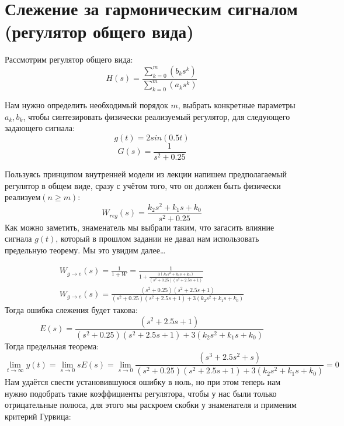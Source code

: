 \chapter{Слежение за гармоническим сигналом (регулятор общего вида)}
\label{ch:chap6}

Рассмотрим регулятор общего вида:
$$
H(s) = \frac{\sum^m_{k=0}(b_ks^k)}{\sum^m_{k=0}(a_ks^k)}
$$

Нам нужно определить необходимый порядок $m$, выбрать конкретные параметры $a_k, b_k$, чтобы синтезировать
физически реализуемый регулятор, для следующего задающего сигнала:
$$
g(t) = 2sin(0.5t)
$$
$$
G(s) = \frac{1}{s^2 + 0.25}
$$

Пользуясь принципом внутренней модели из лекции напишем предполагаемый регулятор в общем виде, сразу с учётом того, что он должен быть физически реализуем$(n\geq m)$:
$$
W_{reg}(s) = \frac{k_2s^2 + k_1s + k_0}{s^2 + 0.25}
$$
Как можно заметить, знаменатель мы выбрали таким, что загасить влияние сигнала $g(t)$, который в прошлом задании не давал нам использовать предельную теорему. Мы это увидим далее\dots

$$
\begin{aligned}
  W_{g\to e}(s) = \frac{1}{1 + W} = \frac{1}{1 + \frac{3(k_2s^2 + k_1s + k_0)}{(s^2 + 0.25)(s^2+2.5s+1)}} \\
  W_{g\to e}(s) = \frac{(s^2 + 0.25)(s^2+2.5s+1)}{ (s^2 + 0.25)(s^2+2.5s+1) + 3(k_2s^2 + k_1s + k_0)} 
\end{aligned}
$$
Тогда ошибка слежения будет такова:
$$
E(s) = \frac{(s^2+2.5s+1)}{ (s^2 + 0.25)(s^2+2.5s+1) + 3(k_2s^2 + k_1s + k_0)} 
$$
Тогда предельная теорема:
$$
\lim_{t\to\infty}y(t) = \lim_{s\to 0}sE(s) = \lim_{s\to 0}\frac{(s^3+2.5s^2+s)}{ (s^2 + 0.25)(s^2+2.5s+1) + 3(k_2s^2 + k_1s + k_0)}  = 0
$$
Нам удаётся свести установившуюся ошибку в ноль, но при этом теперь нам нужно подобрать такие коэффициенты регулятора, 
чтобы у нас были только отрицательные полюса, для этого мы раскроем скобки у знаменателя и применим критерий Гурвица:

